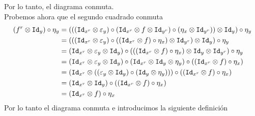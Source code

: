\documentclass[../main.tex]{subfiles}
\begin{document}
    Por lo tanto, el diagrama conmuta. \\
    Probemos ahora que el segundo cuadrado conmuta 
    \begin{align*}
        (f^r \otimes \texttt{Id}_y)\circ \eta_y &= (((\texttt{Id}_{x^r} \otimes \varepsilon_y) \circ (\texttt{Id}_{x^r} \otimes f \otimes \texttt{Id}_{y^r}) \circ (\eta_x \otimes \texttt{Id}_{y^r})) \otimes \texttt{Id}_y) \circ \eta_y \\
        &= (((\texttt{Id}_{x^r} \otimes \varepsilon_y) \circ ((\texttt{Id}_{x^r} \otimes f ) \circ \eta_x)\otimes \texttt{Id}_{y^r}) \otimes \texttt{Id}_y) \circ \eta_y \\
        &= (\texttt{Id}_{x^r} \otimes \varepsilon_y \otimes \texttt{Id}_y) \circ (((\texttt{Id}_{x^r} \otimes f) \circ \eta_x) \otimes \texttt{Id}_y \otimes \texttt{Id}_{y^r}) \circ \eta_y \\
        &= (\texttt{Id}_{x^r} \otimes \varepsilon_y \otimes \texttt{Id}_y) \circ (\texttt{Id}_{x^r} \otimes \texttt{Id}_y \otimes \eta_y) \circ ((\texttt{Id}_{x^r} \otimes f)\circ \eta_x) \\
        &= (\texttt{Id}_{x^r} \otimes ((\varepsilon_y \otimes \texttt{Id}_y)\circ(\texttt{Id}_y \otimes \eta_y))) \circ ((\texttt{Id}_{x^r} \otimes f)\circ \eta_x) \\
        &= (\texttt{Id}_{x^r} \otimes \texttt{Id}_y) \circ ((\texttt{Id}_{x^r} \otimes f)\circ \eta_x) \\
        &= (\texttt{Id}_{x^r} \otimes f)\circ \eta_x
    \end{align*}
    Por lo tanto el diagrama conmuta e introducimos la siguiente definición
\end{document}
